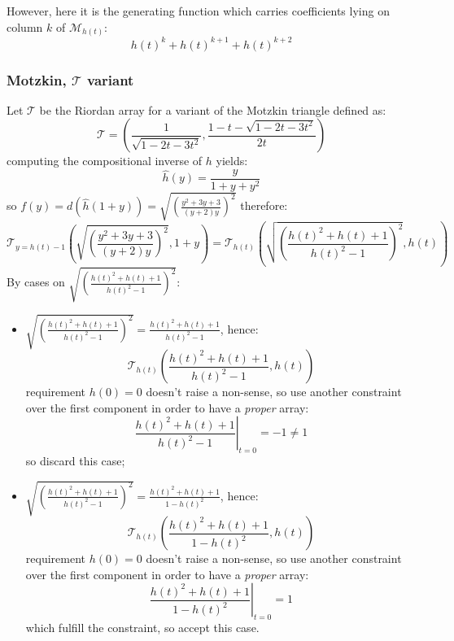 However, here it is the generating function which carries coefficients 
lying on column $k$ of $\mathcal{M}_{h(t)}$:
\begin{displaymath} 
    h(t)^{k}+h(t)^{k+1}+h(t)^{k+2}
\end{displaymath} 


\subsubsection{Motzkin, $\mathcal{T}$ variant}

Let $\mathcal{T}$ be the Riordan array for a variant of the Motzkin triangle defined as:
\begin{displaymath} 
    \mathcal{T} = \left(\frac{1}{\sqrt{1-2t-3t^2}}, 
       \frac{1-t-\sqrt{1-2t-3t^2}}{2t}  \right)
\end{displaymath} 
computing the compositional inverse of $h$ yields:
\begin{displaymath} 
    \hat{h}(y) = \frac{y}{1+y+y^2}
\end{displaymath} 
so $f(y)=d(\hat{h}(1+y))=\sqrt{\left(\frac{y^2+3y+3}{(y+2)y}\right)^{2}}$ therefore:
\begin{displaymath} 
    \mathcal{T}_{y=h(t)-1}\left( \sqrt{\left(\frac{y^2+3y+3}{(y+2)y}\right)^{2}}, 1+y \right) = 
        \mathcal{T}_{h(t)}\left( \sqrt{\left(\frac{h(t)^2+h(t)+1}{h(t)^2-1}\right)^{2}}, h(t) \right) 
\end{displaymath} 
By cases on $\sqrt{\left(\frac{h(t)^2+h(t)+1}{h(t)^2-1}\right)^{2}}$:
\begin{itemize}
    \item $\sqrt{\left(\frac{h(t)^2+h(t)+1}{h(t)^2-1}\right)^{2}}=\frac{h(t)^2+h(t)+1}{h(t)^2-1}$, hence:
        \begin{displaymath} 
            \mathcal{T}_{h(t)}\left(\frac{h(t)^2+h(t)+1}{h(t)^2-1}, h(t) \right)
        \end{displaymath} 
        requirement $h(0)=0$ doesn't raise a non-sense, so use another 
        constraint over the first component in order to have a 
        \emph{proper} array:
        \begin{displaymath}
            \left. \frac{h(t)^2+h(t)+1}{h(t)^2-1} \right|_{t=0} = -1 \not= 1 
        \end{displaymath} 
        so discard this case;
    \item $\sqrt{\left(\frac{h(t)^2+h(t)+1}{h(t)^2-1}\right)^{2}}=\frac{h(t)^2+h(t)+1}{1-h(t)^2}$, hence:
        \begin{displaymath}
            \mathcal{T}_{h(t)}\left(\frac{h(t)^2+h(t)+1}{1-h(t)^2}, h(t) \right)
        \end{displaymath} 
        requirement $h(0)=0$ doesn't raise a non-sense, so use another 
        constraint over the first component in order to have a 
        \emph{proper} array:
        \begin{displaymath}
            \left. \frac{h(t)^2+h(t)+1}{1-h(t)^2} \right|_{t=0} = 1 
        \end{displaymath} 
        which fulfill the constraint, so accept this case.
\end{itemize}
